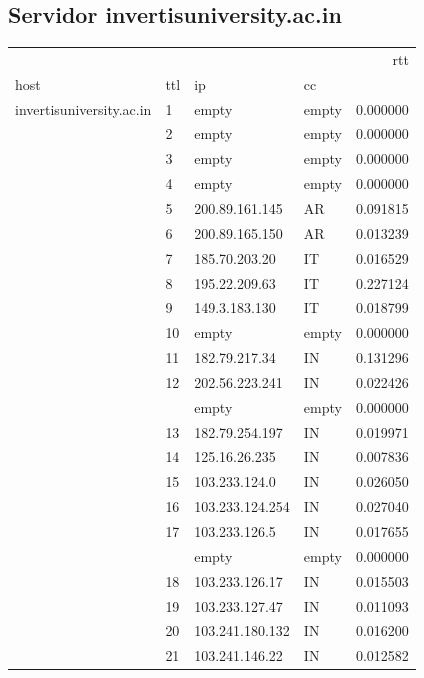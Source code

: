 \subsection{Servidor invertisuniversity.ac.in}

\begin{center}
\begin{tabular}{llllr}
\toprule
                         &    &               &    &       rtt \\
host & ttl & ip & cc &           \\
\midrule
invertisuniversity.ac.in & 1  & empty & empty &  0.000000 \\
                         & 2  & empty & empty &  0.000000 \\
                         & 3  & empty & empty &  0.000000 \\
                         & 4  & empty & empty &  0.000000 \\
                         & 5  & 200.89.161.145 & AR &  0.091815 \\
                         & 6  & 200.89.165.150 & AR&  0.013239 \\
                         & 7  & 185.70.203.20 & IT &  0.016529 \\
                         & 8  & 195.22.209.63 & IT &  0.227124 \\
                         & 9  & 149.3.183.130 & IT &  0.018799 \\
                         & 10 & empty & empty &  0.000000 \\
                         & 11 & 182.79.217.34 & IN &  0.131296 \\
                         & 12 & 202.56.223.241 & IN &  0.022426 \\
                         &    & empty & empty &  0.000000 \\
                         & 13 & 182.79.254.197 & IN &  0.019971 \\
                         & 14 & 125.16.26.235 & IN &  0.007836 \\
                         & 15 & 103.233.124.0 & IN &  0.026050 \\
                         & 16 & 103.233.124.254 & IN &  0.027040 \\
                         & 17 & 103.233.126.5 & IN &  0.017655 \\
                         &    & empty & empty &  0.000000 \\
                         & 18 & 103.233.126.17 & IN &  0.015503 \\
                         & 19 & 103.233.127.47 & IN &  0.011093 \\
                         & 20 & 103.241.180.132 & IN &  0.016200 \\
                         & 21 & 103.241.146.22 & IN &  0.012582 \\
\bottomrule
\end{tabular}

\end{center}

